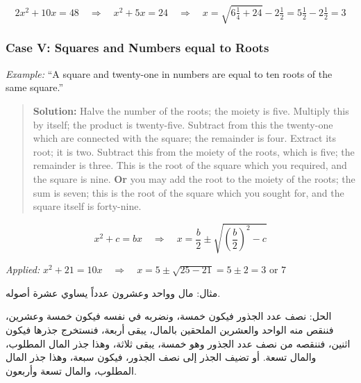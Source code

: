 \documentclass[11pt,a4paper]{book}
\begin{document}
\begin{equation}
2x^2 + 10x = 48 \quad\Rightarrow\quad x^2 + 5x = 24 \quad\Rightarrow\quad
x = \sqrt{6\tfrac{1}{4} + 24} - 2\tfrac{1}{2} = 5\tfrac{1}{2} - 2\tfrac{1}{2} = 3
\end{equation}

\subsubsection*{Case V: Squares and Numbers equal to Roots}

\textit{Example:} ``A square and twenty-one in numbers are equal to ten roots
of the same square.''

\begin{quote}
\textbf{Solution:} Halve the number of the roots; the moiety is five.
Multiply this by itself; the product is twenty-five. Subtract from this the
twenty-one which are connected with the square; the remainder is four.
Extract its root; it is two. Subtract this from the moiety of the roots,
which is five; the remainder is three. This is the root of the square which
you required, and the square is nine. \textbf{Or} you may add the root to the
moiety of the roots; the sum is seven; this is the root of the square which
you sought for, and the square itself is forty-nine.
\end{quote}

\begin{mathbox}[title={\textbf{The Algorithm for Case V}}]
\begin{equation}
x^2 + c = bx \quad\Longrightarrow\quad x = \frac{b}{2} \pm \sqrt{\left(\frac{b}{2}\right)^2 - c}
\end{equation}

\textit{Applied:} $x^2 + 21 = 10x \quad\Rightarrow\quad x = 5 \pm \sqrt{25 - 21} = 5 \pm 2 = 3 \text{ or } 7$
\end{mathbox}

\begin{arabicbox}
\begin{Arabic}
مثال: مال وواحد وعشرون عدداً يساوي عشرة أصوله.

الحل: نصف عدد الجذور فيكون خمسة، ونضربه في نفسه فيكون
خمسة وعشرين، فننقص منه الواحد والعشرين الملحقين بالمال،
يبقى أربعة، فنستخرج جذرها فيكون اثنين، فننقصه من نصف عدد
الجذور وهو خمسة، يبقى ثلاثة، وهذا جذر المال المطلوب، والمال
تسعة. أو تضيف الجذر إلى نصف الجذور، فيكون سبعة، وهذا جذر
المال المطلوب، والمال تسعة وأربعون.
\end{Arabic}
\end{arabicbox}
\end{document}
